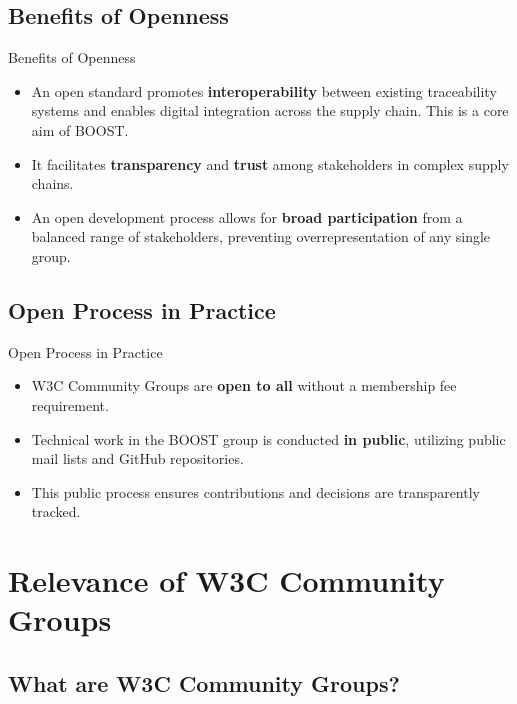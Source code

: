 \documentclass[presentation]{beamer}
\begin{document}
\subsection{Benefits of Openness}
\label{sec:benefits-openness}

\begin{frame}{Benefits of Openness}
\begin{itemize}
\item An open standard promotes \textbf{interoperability} between existing traceability systems and enables digital integration across the supply chain. This is a core aim of BOOST.
\item It facilitates \textbf{transparency} and \textbf{trust} among stakeholders in complex supply chains.
\item An open development process allows for \textbf{broad participation} from a balanced range of stakeholders, preventing overrepresentation of any single group.
\end{itemize}
\end{frame}

\subsection{Open Process in Practice}
\label{sec:open-process-practice}

\begin{frame}{Open Process in Practice}
\begin{itemize}
\item W3C Community Groups are \textbf{open to all} without a membership fee requirement.
\item Technical work in the BOOST group is conducted \textbf{in public}, utilizing public mail lists and GitHub repositories.
\item This public process ensures contributions and decisions are transparently tracked.
\end{itemize}
\end{frame}

\section{Relevance of W3C Community Groups}
\label{sec:w3c-groups}

\subsection{What are W3C Community Groups?}
\label{sec:what-are-w3c-groups}
\end{document}
